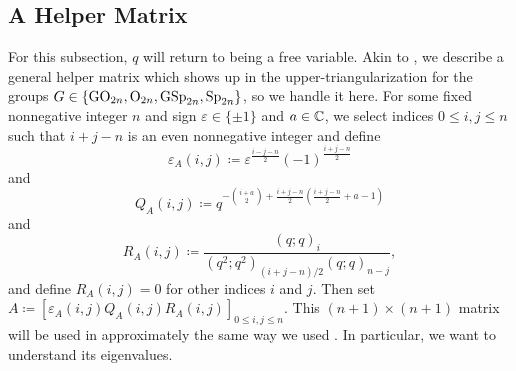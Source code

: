 \subsection{A Helper Matrix} \label{subsec:helper}
For this subsection, $q$ will return to being a free variable. Akin to , we describe a general helper matrix which shows up in the upper-triangularization for the groups $G\in\{\mathrm{GO}_{2n},\mathrm{O}_{2n},\mathrm{GSp}_{2n},\mathrm{Sp}_{2n}\}$, so we handle it here. For some fixed nonnegative integer $n$ and sign $\varepsilon\in\{\pm1\}$ and $a\in\mathbb C$, we select indices $0\le i,j\le n$ such that $i+j-n$ is an even nonnegative integer and define
\[\varepsilon_A(i,j)\coloneqq\varepsilon^{\frac{i-j-n}2}(-1)^{\frac{i+j-n}2}\]
and
\[Q_A(i,j)\coloneqq q^{-\binom{i+a}2+\frac{i+j-n}{2}\left(\frac{i+j-n}{2}+a-1\right)}\]
and
\[R_A(i,j)\coloneqq\frac{(q;q)_i}{(q^2;q^2)_{(i+j-n)/2}(q;q)_{n-j}},\]
and define $R_A(i,j)=0$ for other indices $i$ and $j$. Then  set $A\coloneqq[\varepsilon_A(i,j)Q_A(i,j)R_A(i,j)]_{0\le i,j\le n}$. This $(n+1)\times(n+1)$ matrix will be used in approximately the same way we used . In particular, we want to understand its eigenvalues.
